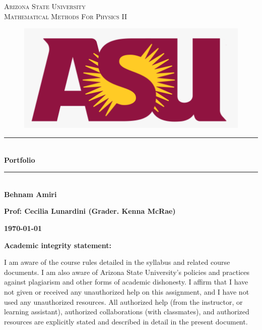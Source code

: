\documentclass[fleqn]{article}
\begin{document}
\begin{titlepage}

\newcommand{\HRule}{\rule{\linewidth}{0.5mm}} %

\center %
 

\textsc{\LARGE Arizona State University}\\[1.5cm] 

\textsc{\LARGE Mathematical Methods For Physics II }\\[1.5cm]


\begin{figure}
  \includegraphics[width=\linewidth]{asu.png}
\end{figure}


\HRule \\[0.4cm]
{ \huge \bfseries Portfolio}\\[0.4cm] 
\HRule \\[1.5cm]
 
\textbf{Behnam Amiri}

\bigbreak

\textbf{Prof: Cecilia Lunardini (Grader. Kenna McRae)}

\bigbreak


\textbf{{\large \today}\\[2cm]}

\vfill

\end{titlepage}

\huge \textbf{Academic integrity statement:}

\bigbreak

\Large I am aware of the course rules detailed in the syllabus and related course documents. I am also aware of Arizona State University’s policies and practices against plagiarism and other forms of academic dishonesty. I affirm that I have not given or received any unauthorized help on this assignment, and I have not used any unauthorized resources. All authorized help (from the instructor, or learning assistant), authorized collaborations (with classmates), and authorized resources are explicitly stated and described in detail in the present document.
\end{document}
